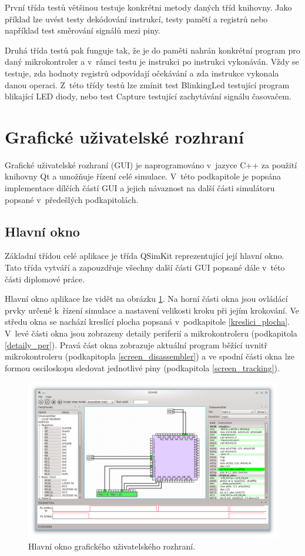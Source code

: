 První třída testů většinou testuje konkrétni metody daných tříd knihovny. Jako příklad lze uvést testy dekódování instrukcí, testy pamětí a registrů nebo například test směrování signálů mezi piny.

Druhá třída testů pak funguje tak, že je do paměti nahrán konkrétní program pro daný mikrokontroler a v~rámci testu je instrukci po instrukci vykonáván. Vždy se testuje, zda hodnoty registrů odpovídají očekávání a zda instrukce vykonala danou operaci. Z~této třídy testů lze zmínit test BlinkingLed testující program blikající LED diody, nebo test Capture testující zachytávání signálu časovačem.

\section{Grafické uživatelské rozhraní}

Grafické uživatelské rozhraní (GUI) je naprogramováno v~jazyce C++ za použití knihovny Qt a umožňuje řízení celé simulace. V~této podkapitole je popsána implementace dílčích částí GUI a jejich návaznost na další části simulátoru popsané v~předešlých podkapitolách.

\subsection{Hlavní okno}

Základní třídou celé aplikace je třída QSimKit reprezentující její hlavní okno. Tato třída vytváří a zapouzdřuje všechny další části GUI popsané dále v~této části diplomové práce.

Hlavní okno aplikace lze vidět na obrázku \ref{fig:screen}. Na horní části okna jsou ovládácí prvky určené k~řízení simulace a nastavení velikosti kroku při jejím krokování. Ve středu okna se nachází kreslící plocha popsaná v~podkapitole \ref{kreslici_plocha}. V~levé části okna jsou zobrazeny detaily periferií a mikrokontroleru (podkapitola \ref{detaily_per}). Pravá část okna zobrazuje aktuální program běžící uvnitř mikrokontroleru (podkapitopla \ref{screen_disassembler}) a ve spodní části okna lze formou osciloskopu sledovat jednotlivé piny (podkapitola \ref{screen_tracking}).

\begin{figure}[ht]
\centering
\includegraphics[trim=0cm 0cm 0cm 0cm, scale=0.45]{fig/screen}
\caption{Hlavní okno grafického uživatelského rozhraní.}
\label{fig:screen}
\end{figure}

